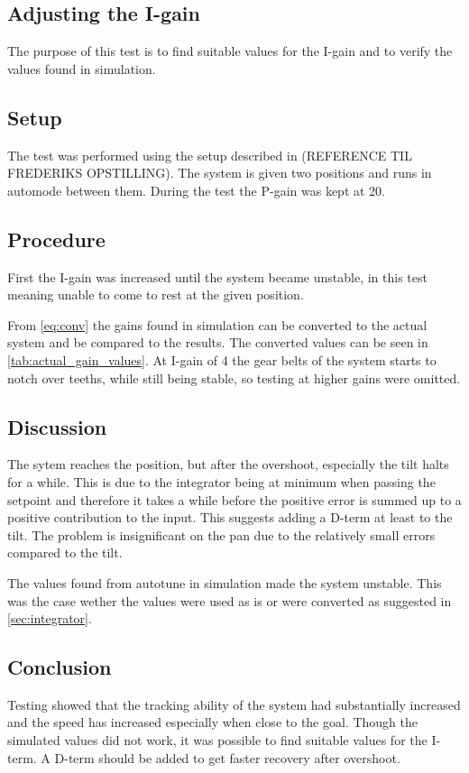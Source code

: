 \subsection{Adjusting the I-gain}\label{sec:pid_experiments_i}
The purpose of this test is to find suitable values for the I-gain and to verify the values found in simulation.

\subsection{Setup}
The test was performed using the setup described in (REFERENCE TIL FREDERIKS OPSTILLING). The system is given two positions and runs in automode between them. During the test the P-gain was kept at 20.

\subsection{Procedure}
First the I-gain was increased until the system became unstable, in this test meaning unable to come to rest at the given position. 

From \ref{eq:conv} the gains found in simulation can be converted to the actual system and be compared to the results. The converted values can be seen in \ref{tab:actual_gain_values}. At I-gain of 4 the gear belts of the system starts to notch over teeths, while still being stable, so testing at higher gains were omitted.

\subsection{Discussion}
The sytem reaches the position, but after the overshoot, especially the tilt halts for a while. This is due to the integrator being at minimum when passing the setpoint and therefore it takes a while before the positive error is summed up to a positive contribution to the input. This suggests adding a D-term at least to the tilt. The problem is insignificant on the pan due to the relatively small errors compared to the tilt.

The values found from autotune in simulation made the system unstable. This was the case wether the values were used as is or were converted as suggested in \ref{sec:integrator}.

\subsection{Conclusion}
Testing showed that the tracking ability of the system had substantially increased and the speed has increased especially when close to the goal. Though the simulated values did not work, it was possible to find suitable values for the I-term. A D-term should be added to get faster recovery after overshoot.

